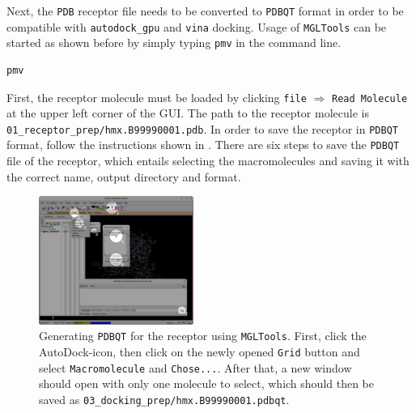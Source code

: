 \documentclass[9pt,tutorial]{livecoms}
\newcommand{\code}[1]{\colorbox{light-gray}{\texttt{#1}}}
\begin{document}
Next, the \texttt{PDB} receptor file needs to be converted to \texttt{PDBQT} format in order to be compatible with \code{autodock\_gpu} and \code{vina} docking. Usage of \texttt{MGLTools} can be started as shown before by simply typing \code{pmv} in the command line.
\begin{lstlisting}[language=bash]
pmv
\end{lstlisting}
First, the receptor molecule must be loaded by clicking \code{file} $\Rightarrow$ \code{Read Molecule} at the upper left corner of the GUI. The path to the receptor molecule is \code{01\_receptor\_prep/hmx.B99990001.pdb}. In order to save the receptor in \texttt{PDBQT} format, follow the instructions shown in . There are six steps to save the \texttt{PDBQT} file of the receptor, which entails selecting the macromolecules and saving it with the correct name, output directory and format. 

\begin{figure}[H]
\centering
\includegraphics[width=0.45\textwidth]{figures/mgltools_process_guide.png}
\caption{Generating \texttt{PDBQT} for the receptor using \texttt{MGLTools}. First, click the AutoDock-icon, then click on the newly opened \code{Grid} button and select \code{Macromolecule} and \code{Chose...}. After that, a new window should open with only one molecule to select, which should then be saved as \code{03\_docking\_prep/hmx.B99990001.pdbqt}.}
\label{fig:mgltools_process_guide}
\end{figure}
\end{document}
